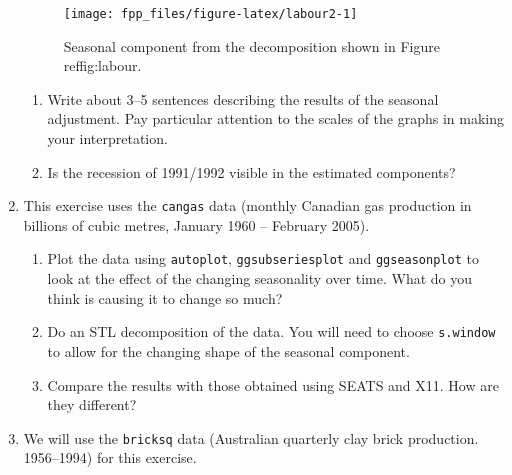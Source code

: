\documentclass[]{book}
\providecommand{\tightlist}{%
  \setlength{\itemsep}{0pt}\setlength{\parskip}{0pt}}
\begin{document}
\begin{enumerate}
\begin{figure}
   {\centering \texttt{[image: fpp\_files/figure-latex/labour2-1]} 

   }

   \caption{Seasonal component from the decomposition shown in Figure \\ref{fig:labour}.}\label{fig:labour2}
   \end{figure}

  \begin{enumerate}
  \def\labelenumii{\alph{enumii}.}
  \tightlist
  \item
    Write about 3--5 sentences describing the results of the seasonal adjustment. Pay particular attention to the scales of the graphs in making your interpretation.
  \item
    Is the recession of 1991/1992 visible in the estimated components?
  \end{enumerate}
\item
  This exercise uses the \texttt{cangas} data (monthly Canadian gas production in billions of cubic metres, January 1960 -- February 2005).

  \begin{enumerate}
  \def\labelenumii{\alph{enumii}.}
  \tightlist
  \item
    Plot the data using \texttt{autoplot}, \texttt{ggsubseriesplot} and \texttt{ggseasonplot} to look at the effect of the changing seasonality over time. What do you think is causing it to change so much?
  \item
    Do an STL decomposition of the data. You will need to choose \texttt{s.window} to allow for the changing shape of the seasonal component.
  \item
    Compare the results with those obtained using SEATS and X11. How are they different?
  \end{enumerate}
\item
  We will use the \texttt{bricksq} data (Australian quarterly clay brick production. 1956--1994) for this exercise.


\end{enumerate}
\end{document}
